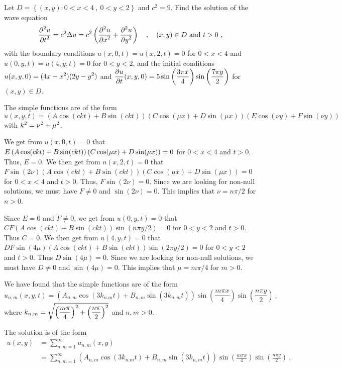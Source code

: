 \begin{egg}
Let $D =\left\{ (x,y) : 0 < x < 4 \ ,\ 0 < y < 2 \right\}$ and
$c^2 = 9$.  Find the solution of the wave equation
\[
\frac{\displaystyle \partial^{2}{u}} {\displaystyle \partial t^{2}} = c^2 \Delta u = c^2 \left(\frac{\displaystyle \partial^{2}{u}} {\displaystyle \partial x^{2}} +
\frac{\displaystyle \partial^{2}{u}} {\displaystyle \partial y^{2}}\right) \quad , \quad (x,y) \in D\ \text{and}\ t > 0 \ ,
\]
with the boundary conditions
$u(x,0,t) = u(x,2,t) = 0$ for $0<x<4$ and
$u(0,y,t) = u(4,y,t) = 0$ for $0<y<2$,
and the initial conditions
$\displaystyle u(x,y,0) = (4x-x^2)(2y-y^2)$ and
$\displaystyle \frac{\partial{u}}{\partial t}(x,y,0) = 5\sin\left(\frac{3\pi x}{4}\right)
\sin\left(\frac{7\pi y}{2}\right)$ for $(x,y) \in D$.

The simple functions are of the form
\[
u(x,y,t) = \left(A \cos (ckt) + B \sin (ckt)\right)
\left(C \cos (\mu x) + D \sin (\mu x)\right)
\left(E \cos (\nu y) + F \sin (\nu y)\right)
\]
with $\displaystyle k^2 = \nu^2 + \mu^2$.

We get from $u(x,0,t) = 0$ that
$\displaystyle E\left(A \cos (ckt) + B \sin (ckt)\right)\left(C \cos (\mu x)
+ D \sin (\mu x)\right)=0$ for $0<x<4$ and $t>0$.
Thus, $E=0$.  We then get from $u(x,2,t) =0$ that\\
$F\sin(2\nu) \left(A \cos (ckt) + B \sin (ckt)\right)
\left(C \cos (\mu x) + D \sin (\mu x)\right)= 0$
for $0<x<4$ and $t>0$.
Thus, $F\sin(2\nu)=0$.  Since we are looking for non-null
solutions, we must have $F\neq 0$ and $\sin(2\nu)=0$.  This implies
that $\nu = n\pi/2$ for $n>0$.

Since $E=0$ and $F\neq 0$, we get from $u(0,y,t) = 0$ that \\
$C F \left(A \cos (ckt) + B \sin (ckt)\right) \sin (n\pi y/2)=0$
for $0<y<2$ and $t>0$.  Thus $C=0$.  We then get
from $u(4,y,t) =0$ that
$D F \sin (4\mu)\left(A \cos (ckt) + B \sin (ckt)\right) \sin (2\pi y/2)= 0$
for $0<y<2$ and $t>0$.  Thus $D\sin(4\mu)=0$.  Since
we are looking for non-null solutions, we must have $D\neq 0$ and
$\sin(4\mu)=0$.  This implies that $\mu = m\pi/4$ for $m>0$.

We have found that the simple functions are of the form
\[
u_{n,m}(x,y,t) = \left(A_{n,m} \cos (3 k_{n.m} t) +
B_{n,m} \sin (3 k_{n,m} t)\right)\sin\left(\frac{m\pi x}{4}\right)
\sin\left(\frac{n\pi y}{2}\right) \  ,
\]
where $\displaystyle k_{n.m} =
\sqrt{\left(\frac{m\pi}{4}\right)^2 + \left(\frac{n\pi}{2}\right)^2}$
and $n,m >0$.

The solution is of the form
\begin{align*}
u(x,y) &= \sum_{n,m=1}^\infty u_{n,m}(x,y) \\
&= \sum_{n,m=1}^\infty \left(A_{n,m} \cos (3 k_{n.m} t) +
B_{n,m} \sin (3 k_{n,m} t)\right)\sin\left(\frac{m\pi x}{4}\right)
\sin\left(\frac{n\pi y}{2}\right) \ .
\end{align*}


\end{egg}
